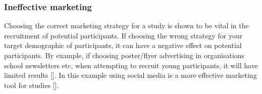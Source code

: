 \subsubsection{Ineffective marketing}
Choosing the correct marketing strategy for a study is shown to be vital in the recruitment of potential participants. If choosing the wrong strategy for your target demographic of participants, it can have a negative effect on potential participants. By example, if choosing poster/flyer advertising in organisations school newsletters etc, when attempting to recruit young participants, it will have limited results [\cite{aj_2015}]. In this example using social media is a more effective marketing tool for studies [\cite{aj_2015}].